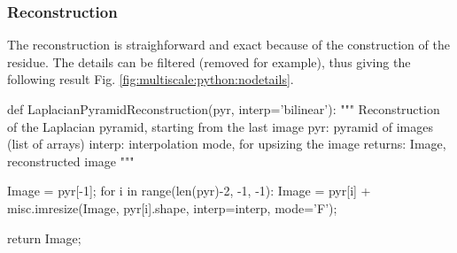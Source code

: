 \begin{figure}[htbp]
 \hfill
 \hfill
 \label{fig:multiscale:python:glpyramid}%
\end{figure}

\subsubsection{Reconstruction}
The reconstruction is straighforward and exact because of the construction of the residue. The details can be filtered (removed for example), thus giving the following result Fig. \ref{fig:multiscale:python:nodetails}.

\begin{python}
def LaplacianPyramidReconstruction(pyr, interp='bilinear'):
    """
    Reconstruction of the Laplacian pyramid, starting from the last image
    pyr: pyramid of images (list of arrays)
    interp: interpolation mode, for upsizing the image
    returns: Image, reconstructed image
    """
    
    Image = pyr[-1];
    for i in range(len(pyr)-2, -1, -1):
        Image = pyr[i] + misc.imresize(Image, pyr[i].shape, interp=interp, mode='F');
        
    return Image;
\end{python}

